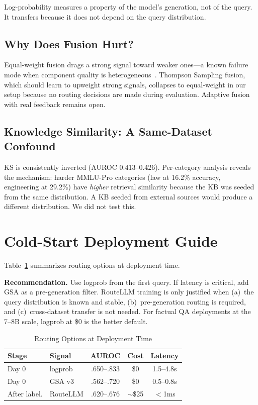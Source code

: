 \documentclass[journal]{IEEEtran}
\begin{document}
Log-probability measures a property of the model's generation, not of the query. It transfers because it does not depend on the query distribution.

\subsection{Why Does Fusion Hurt?}

Equal-weight fusion drags a strong signal toward weaker ones---a known failure mode when component quality is heterogeneous~\cite{dietterich2000ensemble}. Thompson Sampling fusion, which should learn to upweight strong signals, collapses to equal-weight in our setup because no routing decisions are made during evaluation. Adaptive fusion with real feedback remains open.

\subsection{Knowledge Similarity: A Same-Dataset Confound}

KS is consistently inverted (AUROC 0.413--0.426). Per-category analysis reveals the mechanism: harder MMLU-Pro categories (law at 16.2\% accuracy, engineering at 29.2\%) have \emph{higher} retrieval similarity because the KB was seeded from the same distribution. A KB seeded from external sources would produce a different distribution. We did not test this.

\section{Cold-Start Deployment Guide}
\label{sec:deployment}

Table~\ref{tab:deploy} summarizes routing options at deployment time.

\textbf{Recommendation.} Use logprob from the first query. If latency is critical, add GSA as a pre-generation filter. RouteLLM training is only justified when (a)~the query distribution is known and stable, (b)~pre-generation routing is required, and (c)~cross-dataset transfer is not needed. For factual QA deployments at the 7--8B scale, logprob at \$0 is the better default.

\begin{table}[t]
\centering
\caption{Routing Options at Deployment Time}
\label{tab:deploy}
\small
\begin{tabular}{llccc}
\toprule
Stage & Signal & AUROC & Cost & Latency \\
\midrule
Day 0 & logprob & .650--.833 & \$0 & 1.5--4.8s \\
Day 0 & GSA v3 & .562--.720 & \$0 & 0.5--0.8s \\
After label. & RouteLLM & .620--.676 & ${\sim}$\$25 & $<$1ms \\
\bottomrule
\end{tabular}
\end{table}
\end{document}
